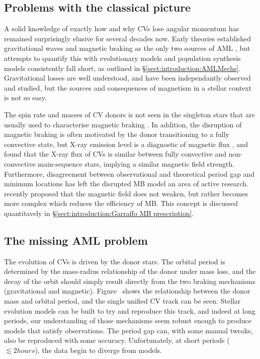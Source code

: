 \subsection{Problems with the classical picture}
\label{sect:introduction:modern AML}
A solid knowledge of exactly how and why CVs lose angular momentum has remained surprisingly elusive for several decades now. Early theories established gravitational waves and magnetic braking as the only two sources of AML , but attempts to quantify this with evolutionary models \citep{knigge11} and population synthesis models  consistently fall short, as outlined in \S\ref{sect:introduction:AMLMechs}. Gravitational losses are well understood, and have been independantly observed and studied, but the sources and consequences of magnetism in a stellar context is not so easy. 

The spin rate and masses of CV donors is not seen in the singleton stars that are usually used to characterise magnetic braking \citep{rappaport1983,matt2015,garraffo2018a}. 
In addition, the disruption of magnetic braking is often motivated by the donor transitioning to a fully convective state, but X-ray emission level is a diagnostic of magnetic flux \citep{pevtsov2003}, and \citet{wright2016} found that the X-ray flux of CVs is similar between fully convective and non-convective main-sequence stars, implying a similar magnetic field strength. Furthermore, disagreement between observational and theoretical period gap and minimum locations \citep{knigge11} has left the disrupted MB model an area of active research. 
\citet{garraffo2018} recently proposed that the magnetic field does not weaken, but rather becomes more complex which reduces the efficiency of MB. This concept is discussed quantitavely in \S\ref{sect:introduction:Garraffo MB prescription}.


\subsection{The missing AML problem}

The evolution of CVs is driven by the donor stars. The orbital period is determined by the mass-radius relationship of the donor under mass loss, and the decay of the orbit should simply result directly from the two braking mechanisms (gravitational and magnetic). Figure~ shows the relationship between the donor mass and orbital period, and the single unified CV track can be seen. Stellar evolution models can be built to try and reproduce this track, and indeed at long periods, our understanding of those mechanisms seem robust enough to produce models that satisfy observations. The period gap can, with some manual tweaks, also be reproduced with some accuracy. Unfortunately, at short periods ($\lesssim 2 hours$), the data begin to diverge from models. 

